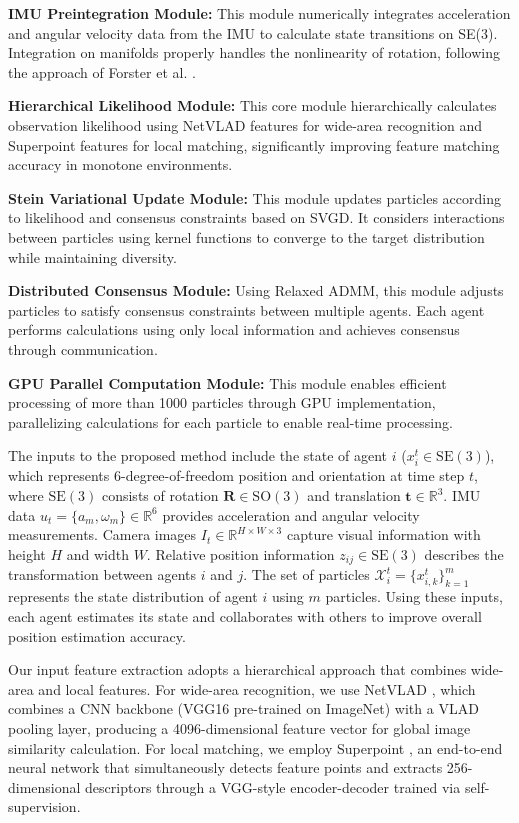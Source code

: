 \documentclass[a4paper,fleqn,10pt,twocolumn]{SICE_ISCS}
\begin{document}
\textbf{IMU Preintegration Module:} This module numerically integrates acceleration and angular velocity data from the IMU to calculate state transitions on SE(3). Integration on manifolds properly handles the nonlinearity of rotation, following the approach of Forster et al. \cite{Forster2017}.

\textbf{Hierarchical Likelihood Module:} This core module hierarchically calculates observation likelihood using NetVLAD features for wide-area recognition and Superpoint features for local matching, significantly improving feature matching accuracy in monotone environments.

\textbf{Stein Variational Update Module:} This module updates particles according to likelihood and consensus constraints based on SVGD. It considers interactions between particles using kernel functions to converge to the target distribution while maintaining diversity.

\textbf{Distributed Consensus Module:} Using Relaxed ADMM, this module adjusts particles to satisfy consensus constraints between multiple agents. Each agent performs calculations using only local information and achieves consensus through communication.

\textbf{GPU Parallel Computation Module:} This module enables efficient processing of more than 1000 particles through GPU implementation, parallelizing calculations for each particle to enable real-time processing.

The inputs to the proposed method include the state of agent $i$ ($x_i^t \in \mathrm{SE}(3)$), which represents 6-degree-of-freedom position and orientation at time step $t$, where $\mathrm{SE}(3)$ consists of rotation $\mathbf{R} \in \mathrm{SO}(3)$ and translation $\mathbf{t} \in \mathbb{R}^3$. IMU data $u_t = \{a_m, \omega_m\} \in \mathbb{R}^6$ provides acceleration and angular velocity measurements. Camera images $I_t \in \mathbb{R}^{H \times W \times 3}$ capture visual information with height $H$ and width $W$. Relative position information $z_{ij} \in \mathrm{SE}(3)$ describes the transformation between agents $i$ and $j$. The set of particles $\mathcal{X}_i^t = \{x_{i,k}^t\}_{k=1}^m$ represents the state distribution of agent $i$ using $m$ particles. Using these inputs, each agent estimates its state and collaborates with others to improve overall position estimation accuracy.

Our input feature extraction adopts a hierarchical approach that combines wide-area and local features. For wide-area recognition, we use NetVLAD \cite{Arandjelovic2016}, which combines a CNN backbone (VGG16 pre-trained on ImageNet) with a VLAD pooling layer, producing a 4096-dimensional feature vector for global image similarity calculation. For local matching, we employ Superpoint \cite{DeTone2018}, an end-to-end neural network that simultaneously detects feature points and extracts 256-dimensional descriptors through a VGG-style encoder-decoder trained via self-supervision.
\end{document}
